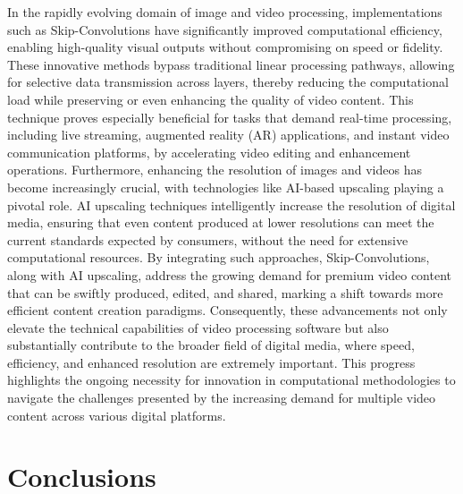 \documentclass[11pt,a4paper,oneside]{report}
\begin{document}
In the rapidly evolving domain of image and video processing, implementations such as Skip-Convolutions \cite{habibian2021skip} have significantly improved computational efficiency, enabling high-quality visual outputs without compromising on speed or fidelity. 
These innovative methods bypass traditional linear processing pathways, allowing for selective data transmission across layers, thereby reducing the computational load while preserving or even enhancing the quality of video content. 
This technique proves especially beneficial for tasks that demand real-time processing, including live streaming, augmented reality (AR) applications, and instant video communication platforms, by accelerating video editing and enhancement operations. 
Furthermore, enhancing the resolution of images and videos has become increasingly crucial, with technologies like AI-based upscaling playing a pivotal role. 
AI upscaling techniques intelligently increase the resolution of digital media, ensuring that even content produced at lower resolutions can meet the current standards expected by consumers, without the need for extensive computational resources. \cite{ignatov2021real}
By integrating such approaches, Skip-Convolutions, along with AI upscaling, address the growing demand for premium video content that can be swiftly produced, edited, and shared, marking a shift towards more efficient content creation paradigms. 
Consequently, these advancements not only elevate the technical capabilities of video processing software but also substantially contribute to the broader field of digital media, where speed, efficiency, and enhanced resolution are extremely important. 
This progress highlights the ongoing necessity for innovation in computational methodologies to navigate the challenges presented by the increasing demand for multiple video content across various digital platforms.



\chapter{Conclusions}
\label{conclusions}
\end{document}
